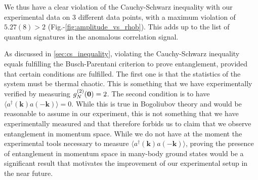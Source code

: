 We thus have a clear violation of the Cauchy-Schwarz inequality with our experimental data on 3 different data points, with a maximum violation of $5.27(8) > 2$ (Fig.-\ref{fig:amplitude_vs_rhob}). This adds up to the list of quantum signatures in the anomalous correlation signal.

As discussed in \ref{sec:cs_inequality}, violating the Cauchy-Schwarz inequality equals fulfilling the Busch-Parentani criterion to prove entanglement, provided that certain conditions are fulfilled. The first one is that the statistics of the system must be thermal chaotic. This is something that we have experimentally verified by measuring $g^{(2)}_N (\bm{0}) = 2$. The second condition is to have $\langle a^{\dagger}({\bm k}) a({-\bm k}) \rangle=0$. While this is true in Bogoliubov theory and would be reasonable to assume in our experiment, this is not something that we have experimentally measured and that therefore forbids us to claim that we observe entanglement in momentum space. While we do not have at the moment the experimental tools necessary to measure $\langle a^{\dagger}({\bm k}) a({-\bm k}) \rangle$, proving the presence of entanglement in momentum space in many-body ground states would be a significant result that motivates the improvement of our experimental setup in the near future. 






